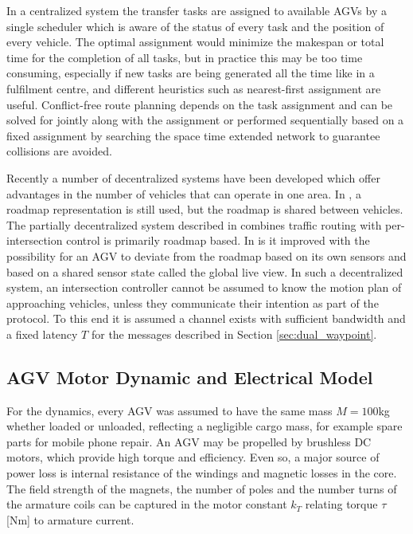 In a centralized system the transfer tasks are assigned to available AGVs by a single scheduler which is aware of the status of every task and the position of every vehicle. The optimal assignment would minimize the makespan or total time for the completion of all tasks, but in practice this may be too time consuming, especially if new tasks are being generated all the time like in a fulfilment centre, and different heuristics such as nearest-first assignment are useful. Conflict-free route planning depends on the task assignment and can be solved for jointly along with the assignment or performed sequentially based on a fixed assignment by searching the space time extended network to guarantee collisions are avoided.

Recently a number of decentralized systems have been developed which offer advantages in the number of vehicles that can operate in one area. In \cite{Walenta2017}, a roadmap representation is still used, but the roadmap is shared between vehicles. The partially decentralized system described in \cite{Digani2014coord} combines traffic routing with per-intersection control is primarily roadmap based. In \cite{Cardarelli2017} is it improved with the possibility for an AGV to deviate from the roadmap based on its own sensors and based on a shared sensor state called the global live view. In such a decentralized system, an intersection controller cannot be assumed to know the motion plan of approaching vehicles, unless they communicate their intention as part of the protocol. To this end it is assumed a channel exists with sufficient bandwidth and a fixed latency $T$ for the messages described in Section \ref{sec:dual_waypoint}.

\subsection{AGV Motor Dynamic and Electrical Model}
For the dynamics, every AGV was assumed to have the same mass $M=100$kg whether loaded or unloaded, reflecting a negligible cargo mass, for example spare parts for mobile phone repair. An AGV may be propelled by brushless DC motors, which provide high torque and efficiency. Even so, a major source of power loss is internal resistance of the windings and magnetic losses in the core.  %
The field strength of the magnets, the number of poles and the number turns of the armature coils can be captured in the motor constant $k_T $ relating torque $\tau$ [Nm] to armature current.

